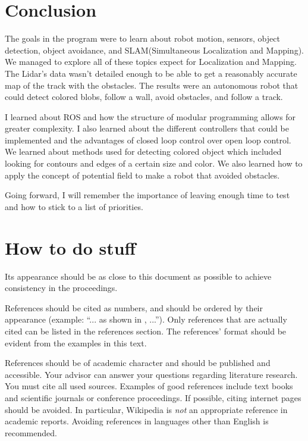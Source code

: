 \documentclass[journal, a4paper]{IEEEtran}
\begin{document}
\section{Conclusion}
\par The goals in the program were to learn about robot motion, sensors, object detection, object avoidance, and SLAM(Simultaneous Localization and Mapping). We managed to explore all of these topics expect for Localization and Mapping. The Lidar's data wasn't detailed enough to be able to get a reasonably accurate map of the track with the obstacles. The results were an autonomous robot that could detect colored blobs, follow a wall, avoid obstacles, and follow a track. 
\par I learned about ROS and how the structure of modular programming allows for greater complexity. I also learned about the different controllers that could be implemented and the advantages of closed loop control over open loop control. We learned about methods used for detecting colored object which included looking for contours and edges of a certain size and color. We also learned how to apply the concept of potential field to make a robot that avoided obstacles. 

\par Going forward, I will remember the importance of leaving enough time to test and how to stick to a list of priorities. 

\section{How to do stuff}
    Its appearance should be as close to this document as possible to achieve consistency in the proceedings.

    References should be cited as numbers, and should be ordered by their appearance (example: ``... as shown in , ...'').
    Only references that are actually cited can be listed in the references section.
    The references' format should be evident from the examples in this text.

    References should be of academic character and should be published and accessible.
    Your advisor can answer your questions regarding literature research.
    You must cite all used sources.
    Examples of good references include text books and scientific journals or conference proceedings.
    If possible, citing internet pages should be avoided. In particular, Wikipedia is \emph{not} an appropriate reference in academic reports.
    Avoiding references in languages other than English is recommended.
\end{document}
